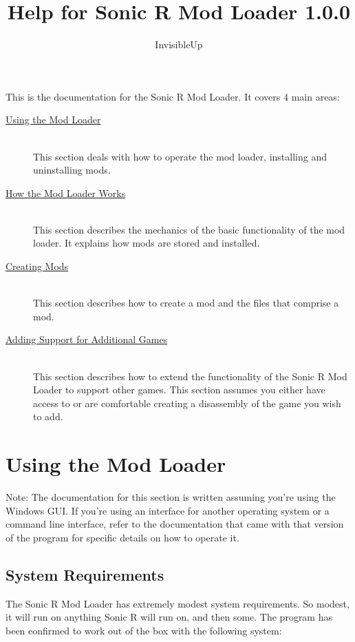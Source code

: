 \documentclass[12pt,a4paper,notitlepage]{article}
\title{Help for Sonic R Mod Loader 1.0.0}
\author{InvisibleUp}
\begin{document}
\maketitle
This is the documentation for the Sonic R Mod Loader. It covers 4 main areas:
\begin{description}
\item[{\hyperref[sec:using]{Using the Mod Loader}}] \hfill \\ 
    This section deals with how to operate the mod loader, installing and uninstalling mods.
\item[{\hyperref[sec:works]{How the Mod Loader Works}}] \hfill \\
    This section describes the mechanics of the basic functionality of the mod loader. It explains how mods are stored and installed.
\item[{\hyperref[sec:create]{Creating Mods}}] \hfill \\
    This section describes how to create a mod and the files that comprise a mod.
\item[{\hyperref[sec:games]{Adding Support for Additional Games}}] \hfill \\
    This section describes how to extend the functionality of the Sonic R Mod Loader to support other games. This section assumes you either have access to or are comfortable creating a disassembly of the game you wish to add.
\end{description} 

\pagebreak
\section{Using the Mod Loader}
\label{sec:using}
Note: The documentation for this section is written assuming you're using the Windows GUI. If you're using an interface for another operating system or a command line interface, refer to the documentation that came with that version of the program for specific details on how to operate it.

\subsection{System Requirements}
The Sonic R Mod Loader has extremely modest system requirements. So modest, it will run on anything Sonic R will run on, and then some. The program has been confirmed to work out of the box with the following system:
\end{document}
